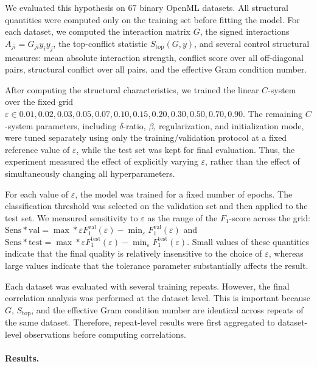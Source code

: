 \documentclass[a4paper,fleqn]{cas-sc}
\begin{document}
We evaluated this hypothesis on $67$ binary OpenML datasets. All structural quantities were computed only on the training set before fitting the model. For each dataset, we computed the interaction matrix $G$, the signed interactions $A_{ji}=G_{ji}y_i y_j$, the top-conflict statistic $S_{\mathrm{top}}(G,y)$, and several control structural measures: mean absolute interaction strength, conflict score over all off-diagonal pairs, structural conflict over all pairs, and the effective Gram condition number.

After computing the structural characteristics, we trained the linear $C$-system over the fixed grid $\varepsilon\in{0.01,0.02,0.03,0.05,0.07,0.10,0.15,0.20,0.30,0.50,0.70,0.90}$. The remaining $C$-system parameters, including $\delta$-ratio, $\beta$, regularization, and initialization mode, were tuned separately using only the training/validation protocol at a fixed reference value of $\varepsilon$, while the test set was kept for final evaluation. Thus, the experiment measured the effect of explicitly varying $\varepsilon$, rather than the effect of simultaneously changing all hyperparameters.

For each value of $\varepsilon$, the model was trained for a fixed number of epochs. The classification threshold was selected on the validation set and then applied to the test set. We measured sensitivity to $\varepsilon$ as the range of the $F_1$-score across the grid: $\mathrm{Sens}*{\mathrm{val}}=\max*{\varepsilon}F_1^{\mathrm{val}}(\varepsilon)-\min_{\varepsilon}F_1^{\mathrm{val}}(\varepsilon)$ and $\mathrm{Sens}*{\mathrm{test}}=\max*{\varepsilon}F_1^{\mathrm{test}}(\varepsilon)-\min_{\varepsilon}F_1^{\mathrm{test}}(\varepsilon)$. Small values of these quantities indicate that the final quality is relatively insensitive to the choice of $\varepsilon$, whereas large values indicate that the tolerance parameter substantially affects the result.

Each dataset was evaluated with several training repeats. However, the final correlation analysis was performed at the dataset level. This is important because $G$, $S_{\mathrm{top}}$, and the effective Gram condition number are identical across repeats of the same dataset. Therefore, repeat-level results were first aggregated to dataset-level observations before computing correlations.

\paragraph{Results.}
\end{document}
